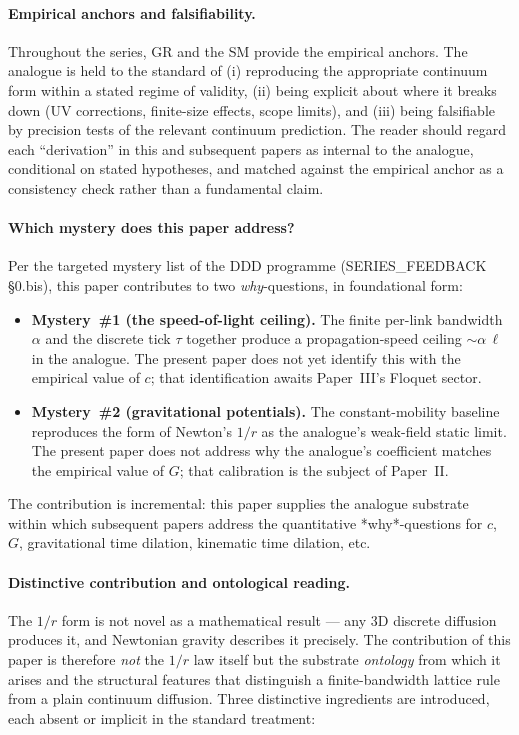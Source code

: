 \documentclass[11pt,a4paper]{article}
\begin{document}
\paragraph{Empirical anchors and falsifiability.} Throughout the
series, GR and the SM provide the empirical anchors. The
analogue is held to the standard of (i) reproducing the
appropriate continuum form within a stated regime of validity,
(ii) being explicit about where it breaks down (UV
corrections, finite-size effects, scope limits), and (iii) being
falsifiable by precision tests of the relevant continuum
prediction. The reader should regard each ``derivation'' in
this and subsequent papers as internal to the analogue,
conditional on stated hypotheses, and matched against the
empirical anchor as a consistency check rather than a
fundamental claim.

\paragraph{Which mystery does this paper address?}
Per the targeted mystery list of the DDD programme
(SERIES\_FEEDBACK §0.bis), this paper contributes to two
\emph{why}-questions, in foundational form:

\begin{itemize}
\item \textbf{Mystery~\#1 (the speed-of-light ceiling).} The
finite per-link bandwidth $\alpha$ and the discrete tick $\tau$
together produce a propagation-speed ceiling $\sim \alpha\,\ell$
in the analogue. The present paper does not yet identify this
with the empirical value of $c$; that identification awaits
Paper~III's Floquet sector.
\item \textbf{Mystery~\#2 (gravitational potentials).} The
constant-mobility baseline reproduces the form of Newton's
$1/r$ as the analogue's weak-field static limit. The present
paper does not address why the analogue's coefficient matches
the empirical value of $G$; that calibration is the subject
of Paper~II.
\end{itemize}

The contribution is incremental: this paper supplies the
analogue substrate within which subsequent papers address the
quantitative *why*-questions for $c$, $G$, gravitational time
dilation, kinematic time dilation, etc.

\paragraph{Distinctive contribution and ontological reading.}
The $1/r$ form is not novel as a mathematical result --- any 3D
discrete diffusion produces it, and Newtonian gravity describes
it precisely. The contribution of this paper is therefore
\emph{not} the $1/r$ law itself but the substrate
\emph{ontology} from which it arises and the structural
features that distinguish a finite-bandwidth lattice rule from
a plain continuum diffusion. Three distinctive ingredients are
introduced, each absent or implicit in the standard treatment:
\end{document}
